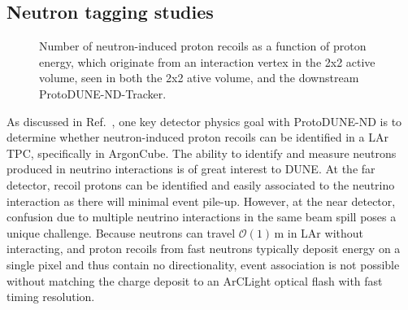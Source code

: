 \subsection{Neutron tagging studies}

\begin{figure}[htb]
  \centering
  \caption{Number of neutron-induced proton recoils as a function of proton energy, which originate from an interaction vertex in the 2x2 active volume, seen in both the 2x2 ative volume, and the downstream ProtoDUNE-ND-Tracker.}
  \label{fig:neutron_tag_minerva}
\end{figure}

As discussed in Ref.~\cite{2x2@FNAL}, one key detector physics goal with ProtoDUNE-ND is to determine whether neutron-induced proton recoils can be identified in a LAr TPC, specifically in ArgonCube. The ability to identify and measure neutrons produced in neutrino interactions is of great interest to DUNE.  At the far detector, recoil protons can be identified and easily associated to the neutrino interaction as there will minimal event pile-up.  However, at the near detector, confusion due to multiple neutrino interactions in the same beam spill poses a unique challenge.  Because neutrons can travel $\mathcal{O}\left(1\right)\,\mathrm{m}$ in LAr without interacting, and proton recoils from fast neutrons typically deposit energy on a single pixel and thus contain no directionality, event association is not possible without matching the charge deposit to an ArCLight optical flash with fast timing resolution.
 

